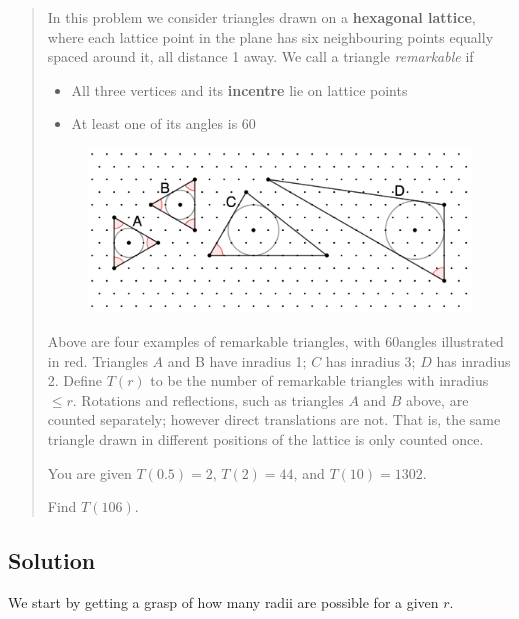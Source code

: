 \begin{quote}
    In this problem we consider triangles drawn on a \textbf{hexagonal lattice}, where each lattice point in the plane has six neighbouring points equally spaced around it, all distance 1 away.
    We call a triangle \textit{remarkable} if
    \begin{itemize}
        \item All three vertices and its \textbf{incentre} lie on lattice points
        \item At least one of its angles is 60\textdegree
    \end{itemize}
    \begin{figure}[ht]
        \centering
        \includegraphics[width=15cm]{challenges/assets/883/0883_diagram.png}
    \end{figure}
    Above are four examples of remarkable triangles, with 60\textdegree angles illustrated in red.
    Triangles $A$ and B have inradius 1; $C$ has inradius 3; $D$ has inradius 2.
    Define $T(r)$ to be the number of remarkable triangles with inradius $\leq r$.
    Rotations and reflections, such as triangles $A$ and $B$ above, are counted separately; however direct translations are not.
    That is, the same triangle drawn in different positions of the lattice is only counted once.

    You are given $T(0.5)=2$, $T(2)=44$, and $T(10)=1302$.

    Find $T(106)$.
\end{quote}
\newpage

\subsection*{Solution}
We start by getting a grasp of how many radii are possible for a given $r$.


